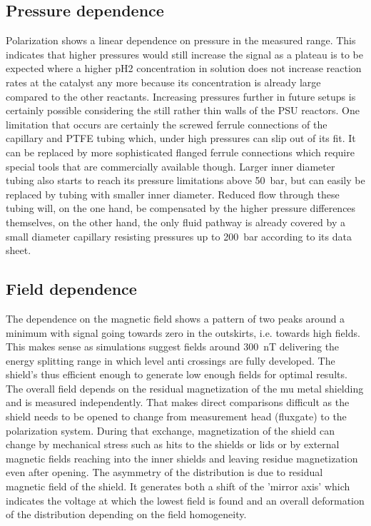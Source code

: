         \subsection{Pressure dependence}
            Polarization shows a linear dependence on pressure in the measured range. This indicates that higher pressures would still increase the signal as a plateau is to be expected where a higher pH2 concentration in solution does not increase reaction rates at the catalyst any more because its concentration is already large compared to the other reactants. Increasing pressures further in future setups is certainly possible considering the still rather thin walls of the PSU reactors. One limitation that occurs are certainly the screwed ferrule connections of the capillary and PTFE tubing which, under high pressures can slip out of its fit. It can be replaced by more sophisticated flanged ferrule connections which require special tools that are commercially available though. Larger inner diameter tubing also starts to reach its pressure limitations above \SI{50}{\bar}, but can easily be replaced by tubing with smaller inner diameter. Reduced flow through these tubing will, on the one hand, be compensated by the higher pressure differences themselves, on the other hand, the only fluid pathway is already covered by a small diameter capillary resisting pressures up to \SI{200}{\bar} according to its data sheet.
        \subsection{Field dependence}
        The dependence on the magnetic field shows a pattern of two peaks around a minimum with signal going towards zero in the outskirts, i.e. towards high fields. This makes sense as simulations suggest fields around \SI{300}{\nano\tesla} delivering the energy splitting range in which level anti crossings are fully developed. The shield's thus efficient enough to generate low enough fields for optimal results. The overall field depends on the residual magnetization of the mu metal shielding and is measured independently. That makes direct comparisons difficult as the shield needs to be opened to change from measurement head (fluxgate) to the polarization system. During that exchange, magnetization of the shield can change by mechanical stress such as hits to the shields or lids or by external magnetic fields reaching into the inner shields and leaving residue magnetization even after opening. The asymmetry of the distribution is due to residual magnetic field of the shield. It generates both a shift of the 'mirror axis' which indicates the voltage at which the lowest field is found  and an overall deformation of the distribution depending on the field homogeneity.
